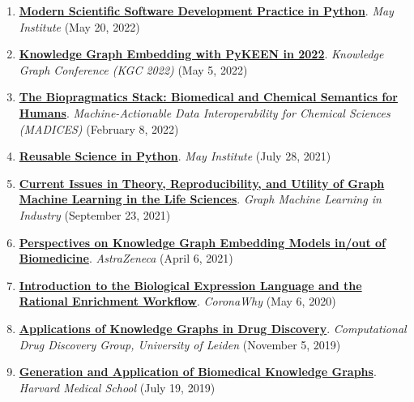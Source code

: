 \documentclass[10pt,a4paper,sans]{moderncv} %
\begin{document}
\begin{enumerate}
    \item \textbf{\href{https://www.youtube.com/watch?v=PSRdj6ysWUA}{Modern Scientific Software Development Practice in Python}}. \textit{May Institute} (May 20, 2022)

    \item \textbf{\href{https://bit.ly/pykeen-kgc2022}{Knowledge Graph Embedding with PyKEEN in 2022}}. \textit{Knowledge Graph Conference (KGC 2022)} (May 5, 2022)

    \item \textbf{\href{https://docs.google.com/presentation/d/1D0HIX41IgVdTQYKlakWcvlZvOktX23EqbLcs3LmI7mg/edit?usp=sharing}{The Biopragmatics Stack: Biomedical and Chemical Semantics for Humans}}. \textit{Machine-Actionable Data Interoperability for Chemical Sciences (MADICES)} (February 8, 2022)

    \item \textbf{\href{https://www.youtube.com/watch?v=f6brWkO9OiE}{Reusable Science in Python}}. \textit{May Institute} (July 28, 2021)

    \item \textbf{\href{https://www.youtube.com/watch?v=bLN1V5fZD2g&t=3665s}{Current Issues in Theory, Reproducibility, and Utility of Graph Machine Learning in the Life Sciences}}. \textit{Graph Machine Learning in Industry} (September 23, 2021)

    \item \textbf{\href{https://bit.ly/3wvP8yq}{Perspectives on Knowledge Graph Embedding Models in/out of Biomedicine}}. \textit{AstraZeneca} (April 6, 2021)

    \item \textbf{\href{https://youtu.be/rHhuVBpoKdI}{Introduction to the Biological Expression Language and the Rational Enrichment Workflow}}. \textit{CoronaWhy} (May 6, 2020)

    \item \textbf{\href{https://docs.google.com/presentation/d/1NQHQSD2EjOh-9XD6ffr2rDqs8AwOQ3wSBoie-e7-OXU/edit?usp=sharing}{Applications of Knowledge Graphs in Drug Discovery}}. \textit{Computational Drug Discovery Group, University of Leiden} (November 5, 2019)

    \item \textbf{\href{https://docs.google.com/presentation/d/11CG_Q3JrsqqKsDhl8uXP_TZzcyALhcVLvoP_pDmQ5JA/edit?usp=sharing}{Generation and Application of Biomedical Knowledge Graphs}}. \textit{Harvard Medical School} (July 19, 2019)

\end{enumerate}
\end{document}
